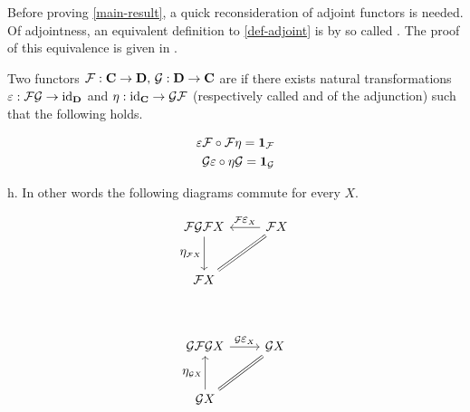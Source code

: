 \documentclass[../../main.tex]{subfiles}
\begin{document}
    Before proving \ref{main-result}, a quick reconsideration of adjoint functors is needed. 
    Of adjointness, an equivalent definition to \ref{def-adjoint} is by so called . The proof of this equivalence is given in \cite{cate-mac}.

    \begin{definition}\label{def-unit-counit}
        Two functors $\functor{F}: \cat{C} \to \cat{D},\, \functor{G}: \cat{D} \to \cat{C}$ are  if there exists natural transformations $\varepsilon: \functor{FG} \to \mathrm{id}_\cat{D}$ and $\eta: \mathrm{id}_\cat{C} \to \functor{GF}$ (respectively called  and  of the adjunction) such that the following holds.

        \begin{align*}
            \varepsilon \functor{F} \circ \functor{F}\eta = \idarrow[\functor{F}] \\ \functor{G}\varepsilon \circ \eta \functor{G} = \idarrow[\functor{G}]
        \end{align*}
        
        h. In other words the following diagrams commute for every $X$.
    \end{definition}

    \begin{figure}[H]
        \begin{subfigure}[b]{0.5\textwidth}
            \[
                \begin{tikzcd}[row sep = large]
                    \functor{FGF}X \arrow[d,"\mathlarger{\eta}_{\functor{F}X}", swap] & \functor{F}X \arrow[l,"\functor{F}\mathlarger{\varepsilon}_X", swap]\\
                    \functor{F}X \arrow[ur, equal]
                \end{tikzcd}
            \]
        \end{subfigure}%
        ~
        \begin{subfigure}[b]{0.5\textwidth}
            \[
                \begin{tikzcd}[row sep = large]
                    \functor{GFG}X \arrow[r,"\functor{G} \mathlarger{\varepsilon}_X"] & \functor{G}X \\
                    \functor{G}X \arrow[u,"\mathlarger{\eta}_{\functor{G}X}"] \arrow[ur, equal]
                \end{tikzcd}
            \]
        \end{subfigure}
    \end{figure}
\end{document}
